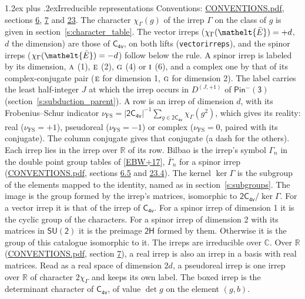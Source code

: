 \documentclass[10pt,a4paper]{article}
\makeatletter
\renewcommand\section{\@startsection{section}{1}{\z@}{-3ex plus -1ex minus -.2ex}%
  {1.2ex plus .2ex}{\normalfont\large\sffamily\bfseries\color{parttitle}}}
\numberwithin{equation}{section}
\newcommand{\eltfont}[1]{{\let\sigma\eltsigma\mathelt{#1}}}
\newcommand{\grp}[1]{\mathsf{#1}}
\newcommand{\irr}[1]{\text{\normalfont\scshape #1}}
\newcommand{\elt}[1]{\eltfont{#1}}
\newcommand{\irrJp}[2]{D^{(#1,#2)}}
\newcommand{\irchar}[1]{\chi_{#1}}
\newcommand{\fsind}{\nu_{\mathrm{FS}}}
\newcommand{\barred}[1]{\bar{#1}}
\makeatother
\begin{document}
\section{Irreducible representations}\label{s:irreps}
Conventions: \href{../../CONVENTIONS.pdf}{CONVENTIONS.pdf}, sections \href{../../../rotation/CONVENTIONS.pdf\#conv.6}{6}, \href{../../../rotation/CONVENTIONS.pdf\#conv.7}{7} and \href{../../CONVENTIONS.pdf\#conv.23}{23}.
\leavevmode\label{n:function.character}\label{n:irrep.Gamma}The character $\irchar{\Gamma}(g)$ of the irrep $\Gamma$ on the class of $g$ is given in section~\ref{s:character_table}. \label{n:index.dimension}The vector irreps ($\irchar{\Gamma}(\elt{\barred{E}}) = +d$, $d$ the dimension) are those of \href{../../../rotation/data/pdf/C4v.pdf}{$\grp{C_{4v}}$}, on both lifts (\texttt{vectorirreps}), and the spinor irreps ($\irchar{\Gamma}(\elt{\barred{E}}) = -d$) follow below the rule. A spinor irrep is labeled by its dimension, $\irr{a}$ (1), $\irr{e}$ (2), $\irr{g}$ (4) or $\irr{i}$ (6), and a complex one by that of its complex-conjugate pair ($\irr{e}$ for dimension 1, $\irr{g}$ for dimension 2). The label carries the least half-integer $J$ at which the irrep occurs in $\irrJp{J}{+1}$ of $\grp{Pin^{-}(3)}$ (section~\ref{s:subduction_parent}).
\leavevmode\label{n:index.frobenius}\label{n:head.irrep}\label{n:head.reality}A row is an irrep of dimension $d$, with its Frobenius--Schur indicator $\fsind = |\grp{2C_{4v}}|^{-1}\allowbreak\sum_{g\in\grp{2C_{4v}}}\irchar{\Gamma}(g^2)$, which gives its reality: real ($\fsind = +1$), pseudoreal ($\fsind = -1$) or complex ($\fsind = 0$, paired with its conjugate). \label{n:head.conjugate}The column conjugate gives that conjugate (a dash for the others). \label{n:head.over.real}Each irrep lies in the irrep over $\mathbb{R}$ of its row. \label{n:head.bilbao}\label{n:irrep.alias.gamma}Bilbao is the irrep's symbol $\Gamma_n$ in the double point group tables of [\href{../../../REFERENCES.pdf\#ref.EBW+17}{EBW+17}], $\bar{\Gamma}_n$ for a spinor irrep (\href{../../CONVENTIONS.pdf}{CONVENTIONS.pdf}, sections \href{../../../rotation/CONVENTIONS.pdf\#conv.6.5}{6.5} and \href{../../CONVENTIONS.pdf\#conv.23.4}{23.4}). \label{n:head.kernel}The kernel $\ker\Gamma$ is the subgroup of the elements mapped to the identity, named as in section~\ref{s:subgroups}. \label{n:head.image}The image is the group formed by the irrep's matrices, isomorphic to $\grp{2C_{4v}}/\ker\Gamma$. For a vector irrep it is that of the irrep of \href{../../../rotation/data/pdf/C4v.pdf}{$\grp{C_{4v}}$}. For a spinor irrep of dimension 1 it is the cyclic group of the characters. For a spinor irrep of dimension 2 with its matrices in $\grp{SU(2)}$ it is the preimage $\grp{2H}$ formed by them. Otherwise it is the group of this catalogue isomorphic to it. The irreps are irreducible over $\mathbb{C}$. Over $\mathbb{R}$ (\href{../../CONVENTIONS.pdf}{CONVENTIONS.pdf}, section \href{../../../rotation/CONVENTIONS.pdf\#conv.7}{7}), a real irrep is also an irrep in a basis with real matrices. Read as a real space of dimension $2d$, a pseudoreal irrep is one irrep over $\mathbb{R}$ of character $2\irchar{\Gamma}$ and keeps its own label. \label{n:mark.determinant}The boxed irrep is the determinant character of \href{../../../rotation/data/pdf/C4v.pdf}{$\grp{C_{4v}}$}, of value $\det g$ on the element $(g, b)$.
\end{document}
